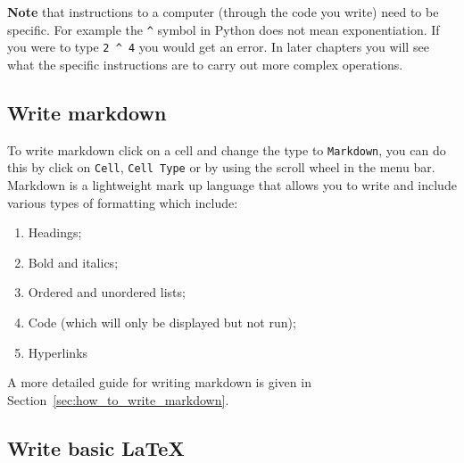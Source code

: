\textbf{Note} that instructions to a computer (through the code you write) need
to be specific. For example the \texttt{\textasciicircum{}} symbol in Python
does not mean exponentiation. If you were to type \texttt{2 \textasciicircum{} 4} you would get an error.
In later chapters you will see what the specific instructions are to carry out more complex operations.

\subsection{Write markdown}

To write markdown click on a cell and change the type to \texttt{Markdown}, you can do
this by click on \texttt{Cell}, \texttt{Cell Type} or by using the scroll wheel in the menu
bar.
Markdown is a lightweight mark up language that allows you to write and
include various types of formatting which include:

\begin{enumerate}

\item 

Headings;

\item 

Bold and italics;

\item 

Ordered and unordered lists;

\item 

Code (which will only be displayed but not run);

\item 

Hyperlinks

\end{enumerate}

A more detailed guide for writing markdown is given in 
Section~\ref{sec:how_to_write_markdown}.

\subsection{Write basic LaTeX}

